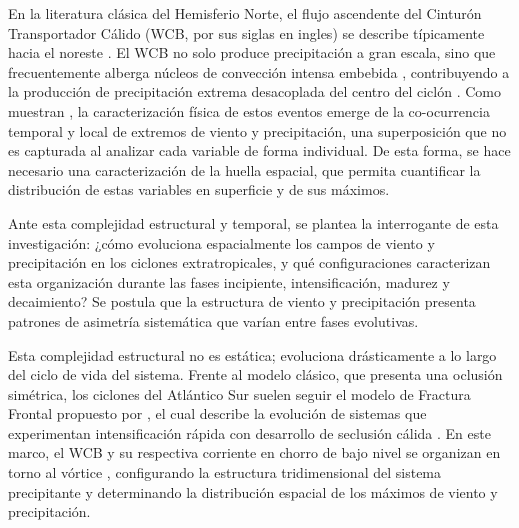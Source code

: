 En la literatura clásica del Hemisferio Norte, el flujo ascendente del Cinturón Transportador Cálido (WCB, por sus siglas en ingles) %
se describe típicamente hacia el noreste \citep{blanchard2021warm}. El WCB no solo produce precipitación a gran escala, sino que frecuentemente alberga núcleos de convección intensa embebida \citep{oertel2021warm}, contribuyendo a la producción de precipitación extrema desacoplada del centro del ciclón \citep{naud2020evaluation}. Como muestran \citet{chen2025characteristics}, la caracterización física de estos eventos emerge de la co-ocurrencia temporal y local de extremos de viento y precipitación, una superposición que no es capturada al analizar cada variable de forma individual. De esta forma, se hace necesario una caracterización de la huella espacial, que permita cuantificar la distribución de estas variables en superficie y de sus máximos. 


Ante esta complejidad estructural y temporal, se plantea la interrogante de esta investigación: ¿cómo evoluciona espacialmente los campos de viento y precipitación en los ciclones extratropicales, y qué configuraciones caracterizan esta organización durante las fases incipiente, intensificación, madurez y decaimiento? 
Se postula que la estructura de viento y precipitación presenta patrones de asimetría sistemática que varían entre fases evolutivas.


Esta complejidad estructural no es estática; evoluciona drásticamente a lo largo del ciclo de vida del sistema. Frente al modelo clásico, que presenta una oclusión simétrica, los ciclones del Atlántico Sur suelen seguir el modelo de Fractura Frontal propuesto por \citet{shapiro1990life}, el cual describe la evolución de sistemas que experimentan intensificación rápida con desarrollo de seclusión cálida \citep{shapiro1999bridge}. En este marco, el WCB y su respectiva corriente en chorro de bajo nivel se organizan en torno al vórtice \citep{browning1986conceptual}, configurando la estructura tridimensional del sistema precipitante y determinando la distribución espacial de los máximos de viento y precipitación.

